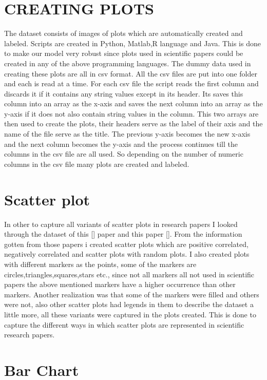 \documentclass[12pt, a4paper,oneside]{report}
\begin{document}
\chapter{CREATING PLOTS}
The dataset consists of images of plots which are automatically created and labeled. Scripts are created in Python, Matlab,R language and Java. This is done to make our model very robust since plots used in scientific papers could be created in any of the above programming languages. The dummy data used in creating these plots are all in csv format. All the csv files are put into one folder and each is read at a time. For each csv file the script reads the first column and discards it if it contains any string values except in its header. Its saves this column into an array as the x-axis and saves the next column into an array as the y-axis if it does not also contain string values in the column. This two arrays are then used to 
create the plots, their headers serve as the label of their axis and the name of the file serve as the title. The previous
y-axis becomes the new x-axis and the next column becomes the y-axis and the process continues till the columns in the csv file are all used. So depending on the number of numeric columns in the csv file many plots are created and labeled.


\chapter{Scatter plot}
In other to capture all variants of scatter plots in research papers I looked through the dataset of this [] paper and this paper []. From the information gotten from those papers i created scatter plots which are positive correlated, negatively correlated and scatter plots with random plots. I also created plots with different markers as the points, some of the markers are circles,triangles,squares,stars etc., since not all markers all not used in scientific papers the above mentioned markers have a higher occurrence than other markers. Another realization was that some of the markers were filled and others were not, also other scatter plots had legends in them to describe the dataset a little more, all these variants were captured in the plots created. This is done to capture the different ways in which scatter plots are represented in scientific research papers.


\chapter{Bar Chart}
\end{document}
